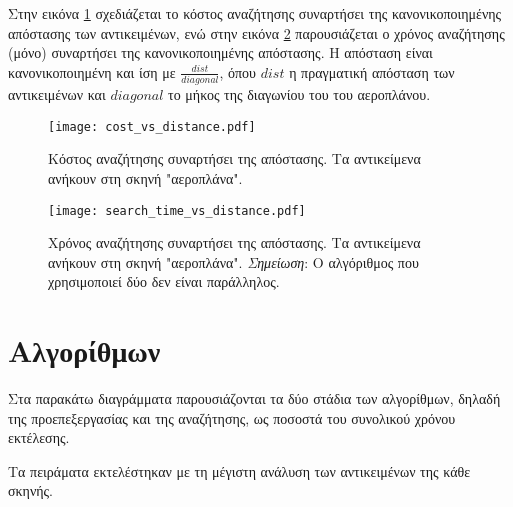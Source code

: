 Στην εικόνα \ref{fig:cost_metric_vs_distance} 
σχεδιάζεται το κόστος αναζήτησης συναρτήσει της 
κανονικοποιημένης απόστασης των αντικειμένων, 
ενώ στην εικόνα \ref{fig:search_time_vs_distance} 
παρουσιάζεται ο χρόνος αναζήτησης (μόνο) συναρτήσει 
της κανονικοποιημένης απόστασης. 
Η απόσταση είναι κανονικοποιημένη και ίση με 
$\frac{dist}{diagonal}$, όπου $dist$ η πραγματική 
απόσταση των αντικειμένων και $diagonal$ το μήκος 
της διαγωνίου του  του αεροπλάνου.


\begin{figure}[H]
    \centering
    \texttt{[image: cost\_vs\_distance.pdf]}
    \caption[Κόστος Αναζήτησης Συναρτήσει της Απόστασης"] {
        Κόστος αναζήτησης συναρτήσει της απόστασης.
        Τα αντικείμενα ανήκουν στη σκηνή "αεροπλάνα".
    }
    \label{fig:cost_metric_vs_distance}
\end{figure}

\begin{figure}[H]
    \centering
    \texttt{[image: search\_time\_vs\_distance.pdf]}
    \caption[Χρόνος Αναζήτησης Συναρτήσει της Απόστασης"] {
        Χρόνος αναζήτησης συναρτήσει της απόστασης.
        Τα αντικείμενα ανήκουν στη σκηνή "αεροπλάνα".
        \textit{Σημείωση}: Ο αλγόριθμος που χρησιμοποιεί δύο  δεν 
        είναι παράλληλος.
    }
    \label{fig:search_time_vs_distance}
\end{figure}

\section{ Αλγορίθμων}
Στα παρακάτω διαγράμματα παρουσιάζονται τα δύο στάδια των 
αλγορίθμων, δηλαδή της προεπεξεργασίας και της αναζήτησης,
ως ποσοστά του συνολικού χρόνου εκτέλεσης. 

Τα πειράματα εκτελέστηκαν με τη μέγιστη ανάλυση 
των αντικειμένων της κάθε σκηνής.



